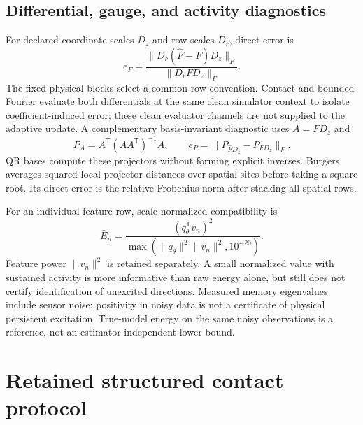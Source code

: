 \documentclass[journal]{IEEEtran}
\begin{document}
\subsection{Differential, gauge, and activity diagnostics}
For declared coordinate scales $D_z$ and row scales $D_r$, direct error is
\begin{equation}
 e_F=\frac{\|D_r(\widehat F-F)D_z\|_F}{\|D_rFD_z\|_F}.
\end{equation}
The fixed physical blocks select a common row convention. Contact and bounded Fourier
evaluate both differentials at the same clean simulator context to isolate
coefficient-induced error; these clean evaluator channels are not supplied to
the adaptive update. A complementary
basis-invariant diagnostic uses $A=FD_z$ and
\begin{equation}
 P_A=A^{\mathsf T}(AA^{\mathsf T})^{-1}A,\qquad
 e_P=\|P_{\widehat F D_z}-P_{FD_z}\|_F.
\end{equation}
QR bases compute these projectors without forming explicit inverses.
Burgers averages squared local projector distances over spatial sites before
taking a square root. Its direct error is the relative Frobenius norm after
stacking all spatial rows.

For an individual feature row, scale-normalized compatibility is
\begin{equation}
 \bar E_n=\frac{(q_\theta^{\mathsf T}v_n)^2}
 {\max(\|q_\theta\|^2\|v_n\|^2,10^{-20})}.
\end{equation}
Feature power $\|v_n\|^2$ is retained separately. A small normalized value
with sustained activity is more informative than raw energy alone, but
still does not certify identification of unexcited directions. Measured
memory eigenvalues include sensor noise; positivity in noisy data is not a
certificate of physical persistent excitation. True-model energy on the same
noisy observations is a reference, not an estimator-independent lower bound.

\section{Retained structured contact protocol}
\label{sec:contact_protocol}
\end{document}
